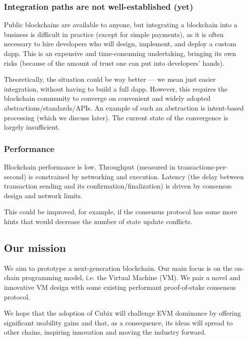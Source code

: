 \documentclass[a4paper]{article}
\begin{document}
\subsubsection{Integration paths are not well-established (yet)}

Public blockchains are available to anyone, but integrating a blockchain into a business is difficult in practice (except for simple payments), as it is often necessary to hire developers who will design, implement, and deploy a custom dapp. This is an expensive and time-consuming undertaking, bringing its own risks (because of the amount of trust one can put into developers' hands).

Theoretically, the situation could be way better --- we mean just easier integration, without having to build a full dapp. However, this requires the blockchain community to converge on convenient and widely adopted abstractions/standards/APIs. An example of such an abstraction is intent-based processing (which we discuss later). The current state of the convergence is largely insufficient.

\subsubsection{Performance}

Blockchain performance is low. Throughput (measured in transactions-per-second) is constrained by networking and execution. Latency (the delay between transaction sending and its confirmation/finalization) is driven by consensus design and network limits.

This could be improved, for example, if the consensus protocol has some more hints that would decrease the number of state update conflicts.

\subsection{Our mission}

We aim to prototype a next-generation blockchain. Our main focus is on the on-chain programming model, i.e. the Virtual Machine (VM). We pair a novel and innovative VM design with some existing performant proof-of-stake consensus protocol.

We hope that the adoption of Cubix will challenge EVM dominance by offering significant usability gains and that, as a consequence, its ideas will spread to other chains, inspiring innovation and moving the industry forward.
\end{document}
